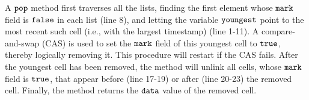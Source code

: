 A ${\tt pop}$ method first traverses all the lists, finding
the first element whose ${\tt mark}$ field is ${\tt false}$ in each list (line 8), and letting the variable ${\tt youngest}$ point to the most recent such cell
(i.e., with the largest timestamp) (line 1-11).
A compare-and-swap (CAS) is used
to set the ${\tt mark}$ field of this youngest cell to ${\tt true}$,
thereby logically removing it.
This procedure will restart if the CAS fails. After the youngest cell has been removed, the method will unlink all cells, whose ${\tt mark}$ field is ${\tt true}$,
that appear before (line 17-19) or after (line 20-23) the removed cell.
Finally, the method returns the ${\tt data}$ value of the removed cell.

